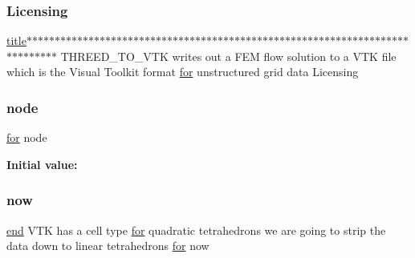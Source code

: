 \mbox{\label{a00611_aee3fdff7ffc0b9af36278d9aa4cec65b}} 
\subsubsection{\texorpdfstring{Licensing}{Licensing}}
{\footnotesize\ttfamily \hyperlink{a00617_a051e403214cb6872ad3fe4e50302a6ee}{title}$\ast$$\ast$$\ast$$\ast$$\ast$$\ast$$\ast$$\ast$$\ast$$\ast$$\ast$$\ast$$\ast$$\ast$$\ast$$\ast$$\ast$$\ast$$\ast$$\ast$$\ast$$\ast$$\ast$$\ast$$\ast$$\ast$$\ast$$\ast$$\ast$$\ast$$\ast$$\ast$$\ast$$\ast$$\ast$$\ast$$\ast$$\ast$$\ast$$\ast$$\ast$$\ast$$\ast$$\ast$$\ast$$\ast$$\ast$$\ast$$\ast$$\ast$$\ast$$\ast$$\ast$$\ast$$\ast$$\ast$$\ast$$\ast$$\ast$$\ast$$\ast$$\ast$$\ast$$\ast$$\ast$$\ast$$\ast$$\ast$$\ast$$\ast$$\ast$$\ast$$\ast$$\ast$$\ast$$\ast$$\ast$ T\+H\+R\+E\+E\+D\+\_\+\+T\+O\+\_\+\+V\+TK writes out a F\+EM flow solution to a V\+TK file which is the Visual Toolkit format \hyperlink{a00623_ad1e7380d51df1e0043d24d3c8a860e0a}{for} unstructured grid data Licensing}

\mbox{\label{a00611_adf51fe9945b6ca147057cc27ff639d0f}} 
\subsubsection{\texorpdfstring{node}{node}}
{\footnotesize\ttfamily \hyperlink{a00623_ad1e7380d51df1e0043d24d3c8a860e0a}{for} node}

{\bfseries Initial value\+:}
\mbox{\label{a00611_aa29f73e143f483fb55111e009a9e426f}} 
\subsubsection{\texorpdfstring{now}{now}}
{\footnotesize\ttfamily \hyperlink{a00608_afb358f48b1646c750fb9da6c6585be2b}{end} V\+TK has a cell type \hyperlink{a00623_ad1e7380d51df1e0043d24d3c8a860e0a}{for} quadratic tetrahedrons we are going to strip the data down to linear tetrahedrons \hyperlink{a00623_ad1e7380d51df1e0043d24d3c8a860e0a}{for} now}

